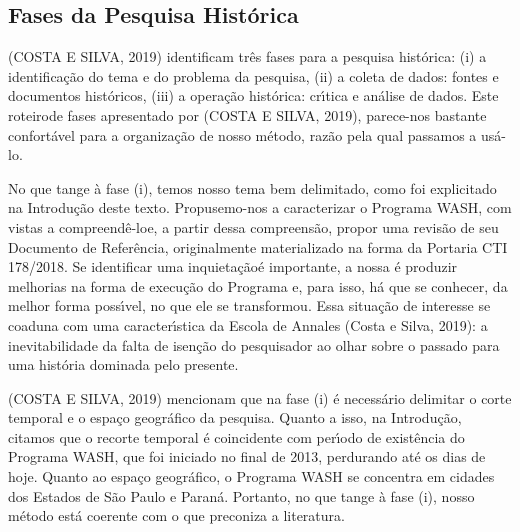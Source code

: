 \documentclass[
12pt,		%
openright,	%
twoside,  %
a4paper,			%
chapter=TITLE,		%
english,			%
french,				%
spanish,			%
brazil				%
]{USPSC-classe/USPSC}
\begin{document}
\subsection[Fases da Pesquisa Hist\'orica]{Fases da Pesquisa Hist\'orica}\label{Fases da Pesquisa Hist\'orica}
(COSTA E SILVA, 2019) identificam tr\^es fases para a pesquisa hist\'orica: (i) a identifica\c{c}\~ao do tema e do problema da pesquisa, (ii) a coleta de dados: fontes e documentos hist\'oricos, (iii) a opera\c{c}\~ao hist\'orica: cr\'{\i}tica e an\'alise de dados. Este \textquotedbl roteiro\textquotedbl  de fases apresentado por (COSTA E SILVA, 2019), parece-nos bastante confort\'avel para a organiza\c{c}\~ao de nosso m\'etodo, raz\~ao pela qual passamos a us\'a-lo.

















No que tange \`a fase (i), temos nosso tema bem delimitado, como foi explicitado na Introdu\c{c}\~ao deste texto. Propusemo-nos a caracterizar o Programa WASH, com vistas a \textquotedbl compreend\^e-lo\textquotedbl  e, a partir dessa compreens\~ao, propor uma revis\~ao de seu Documento de Refer\^encia, originalmente materializado na forma da Portaria CTI 178/2018. Se \textquotedbl identificar uma inquieta\c{c}\~ao\textquotedbl  \'e importante, a nossa \'e produzir melhorias na forma de execu\c{c}\~ao do Programa e, para isso, h\'a que se conhecer, da melhor forma poss\'{\i}vel, no que ele se transformou. Essa situa\c{c}\~ao de \textquotedbl interesse \textquotedbl  se coaduna com uma caracter\'{\i}stica da Escola de Annales  (Costa e Silva, 2019): \textquotedbl a inevitabilidade da falta de isen\c{c}\~ao do pesquisador ao olhar sobre o passado para uma hist\'oria dominada pelo presente.\textquotedbl 

















(COSTA E SILVA, 2019) mencionam que na fase (i) \'e necess\'ario delimitar o \textquotedbl corte temporal \textquotedbl  e o \textquotedbl espa\c{c}o geogr\'afico \textquotedbl  da pesquisa.  Quanto a isso, na Introdu\c{c}\~ao, citamos que o recorte temporal \'e coincidente com per\'{\i}odo de exist\^encia do Programa WASH, que foi iniciado no final de 2013, perdurando at\'e os dias de hoje. Quanto ao espa\c{c}o geogr\'afico, o Programa WASH se concentra em cidades dos Estados de S\~ao Paulo e Paran\'a. Portanto, no que tange \`a fase (i), nosso m\'etodo est\'a coerente com o que preconiza a literatura.
\end{document}
